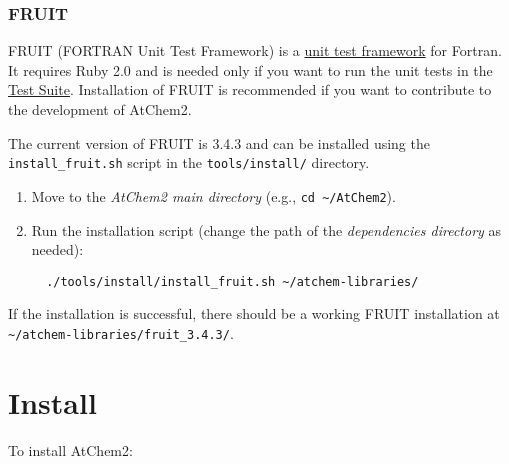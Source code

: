 \subsubsection{FRUIT} \label{fruit}

FRUIT (FORTRAN Unit Test Framework) is a
\href{https://en.wikipedia.org/wiki/Unit_testing}{unit test framework}
for Fortran. It requires Ruby 2.0 and is needed only if you want to
run the unit tests in the \hyperref[sec:testsuite]{Test Suite}.
Installation of FRUIT is recommended if you want to contribute to the
development of AtChem2.

The current version of FRUIT is 3.4.3 and can be installed using the
\texttt{install\_fruit.sh} script in the \texttt{tools/install/}
directory.

\begin{enumerate}
\item Move to the \emph{AtChem2 main directory} (e.g., \texttt{cd\
    \textasciitilde{}/AtChem2}).
\item Run the installation script (change the path of the
  \emph{dependencies directory} as needed):
  \begin{verbatim}
  ./tools/install/install_fruit.sh ~/atchem-libraries/
  \end{verbatim}
\end{enumerate}

If the installation is successful, there should be a working FRUIT
installation at
\texttt{\textasciitilde{}/atchem-libraries/fruit\_3.4.3/}.

\section{Install} \label{sec:install}

To install AtChem2:

